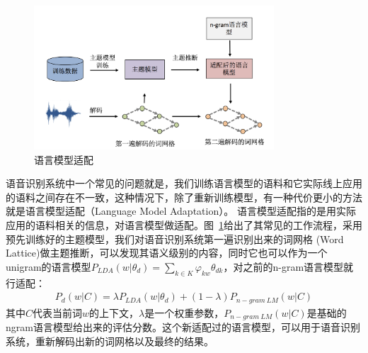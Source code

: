 \begin{figure}[htb]
	\begin{center}
		\includegraphics[width=0.8\textwidth]{img/chapter_lm/lma2.png}
		\caption{语言模型适配}
		\label{pic:lma}
	\end{center}
\end{figure}

语音识别系统中一个常见的问题就是，我们训练语言模型的语料和它实际线上应用的语料之间存在不一致，这种情况下，除了重新训练模型，有一种代价更小的方法就是语言模型适配（Language Model Adaptation）。
语言模型适配指的是用实际应用的语料相关的信息，对语言模型做适配。图~\ref{pic:lma}给出了其常见的工作流程，采用预先训练好的主题模型，我们对语音识别系统第一遍识别出来的词网格
(Word Lattice)做主题推断，可以发现其语义级别的内容，同时它也可以作为一个unigram的语言模型$P_{LDA}(w|\theta_d)=\sum_{k \in K} \varphi_{kw} \theta_{dk}$，对之前的n-gram语言模型就行适配：
\begin{equation}
\begin{aligned}
P_{d}(w|C) = \lambda P_{LDA}(w|\theta_d) + (1-\lambda) P_{n-gram \ LM}(w|C)
\end{aligned}
\label{eq:hb_model}
\end{equation}
其中$C$代表当前词$w$的上下文，$\lambda$是一个权重参数，$P_{n-gram\ LM}(w|C)$是基础的ngram语言模型给出来的评估分数。这个新适配过的语言模型，可以用于语音识别系统，重新解码出新的词网格以及最终的结果。
